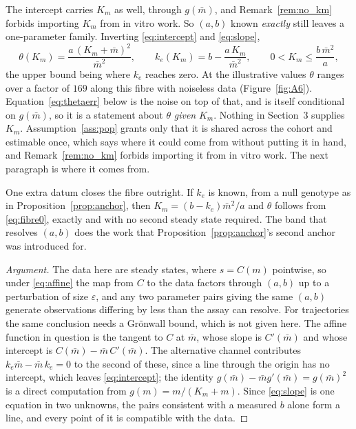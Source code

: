 \begin{remark}
\label{rem:fibre}
The intercept carries $K_m$ as well, through $g(\bar m)$, and Remark~\ref{rem:no_km}
forbids importing $K_m$ from in vitro work. So $(a,b)$ known \emph{exactly} still leaves a
one-parameter family. Inverting \eqref{eq:intercept} and \eqref{eq:slope},
\begin{equation}
\theta(K_m) = \frac{a\,(K_m+\bar m)^2}{\bar m^{2}},
\qquad
k_e(K_m) = b - \frac{a\,K_m}{\bar m^{2}},
\qquad 0 < K_m \le \frac{b\,\bar m^{2}}{a},
\label{eq:fibre0}
\end{equation}
the upper bound being where $k_e$ reaches zero. At the illustrative values $\theta$ ranges
over a factor of $169$ along this fibre with noiseless data (Figure~\ref{fig:A6}).
Equation~\eqref{eq:thetaerr} below is the noise on top of that, and is itself conditional on
$g(\bar m)$, so it is a statement about $\theta$ \emph{given} $K_m$. Nothing in Section~3
supplies $K_m$. Assumption~\ref{ass:pop} grants only that it is shared across the cohort and
estimable once, which says where it could come from without putting it in
hand, and Remark~\ref{rem:no_km} forbids importing it from in vitro work. The next paragraph
is where it comes from.

One extra datum closes the fibre outright. If $k_e$ is known, from a null genotype as in
Proposition~\ref{prop:anchor}, then $K_m = (b - k_e)\bar m^{2}/a$ and $\theta$ follows from
\eqref{eq:fibre0}, exactly and with no second steady state required. The band that resolves
$(a,b)$ does the work that Proposition~\ref{prop:anchor}'s second anchor was introduced for.
\end{remark}

\begin{proof}[Argument]
The data here are steady states, where $s = C(m)$ pointwise, so under \eqref{eq:affine}
the map from $C$ to the data factors through $(a,b)$ up to a perturbation of size
$\varepsilon$, and any two parameter pairs giving the same $(a,b)$ generate observations
differing by less than the assay can resolve. For trajectories the
same conclusion needs a Gr\"onwall bound, which is not given here. The affine function in
question is the tangent to $C$ at $\bar m$, whose slope is $C'(\bar m)$ and whose intercept
is $C(\bar m) - \bar m\, C'(\bar m)$. The alternative channel contributes $k_e \bar m -
\bar m\, k_e = 0$ to the second of these, since a line through the origin has no intercept,
which leaves \eqref{eq:intercept}; the identity $g(\bar m) - \bar m g'(\bar m) = g(\bar m)^2$
is a direct computation from $g(m) = m/(K_m + m)$. Since \eqref{eq:slope} is one equation in
two unknowns, the pairs consistent with a measured $b$ alone form a line, and every point of
it is compatible with the data.
\end{proof}

